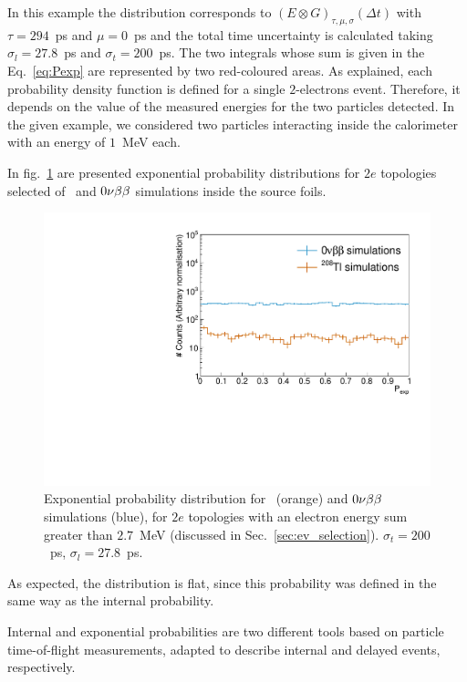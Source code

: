 In this example the distribution corresponds to ${(E \otimes G)_{\tau,\mu,\sigma}(\Delta t)}$ with ${\tau=294}$~ps and ${\mu=0}$~ps and the total time uncertainty is calculated taking $\sigma_{l}=27.8$~ps and $\sigma_{t}=200$~ps.
The two integrals whose sum is given in the Eq.~\eqref{eq:Pexp} are represented by two red-coloured areas.
As explained, each probability density function is defined for a single $2$-electrons event.
Therefore, it depends on the value of the measured energies for the two particles detected.
In the given example, we considered two particles interacting inside the calorimeter with an energy of $1$~MeV each.

In fig.~\ref{fig:Pexp_Tl} are presented exponential probability distributions for $2e$ topologies selected of \Tl\ and $0\nu\beta\beta$ simulations inside the source foils.
\begin{figure}[!h]
  \centering
  \includegraphics[width=13cm]{timedifference/fig_timediff/proba_expo_400.pdf}
  \caption{Exponential probability distribution for \Tl\ (orange) and $0\nu\beta\beta$ simulations (blue), for $2e$ topologies with an electron energy sum greater than $2.7$~MeV (discussed in Sec.~\ref{sec:ev_selection}).
    $\sigma_{t}=200$~ps, $\sigma_{l}=27.8$~ps.
    \label{fig:Pexp_Tl}}
\end{figure}
As expected, the distribution is flat, since this probability was defined in the same way as the internal probability.

Internal and exponential probabilities are two different tools based on particle time-of-flight measurements, adapted to describe internal and delayed events, respectively.

